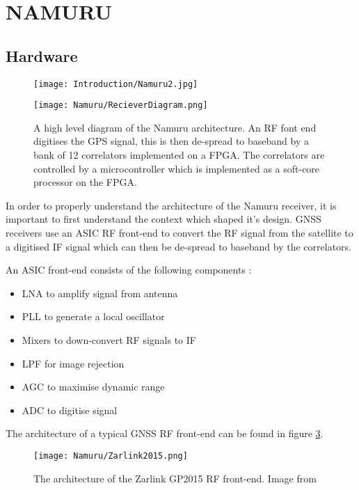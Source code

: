 \section{NAMURU}

\subsection{Hardware}

\begin{figure}[!htb] 
    \centering
    \texttt{[image: Introduction/Namuru2.jpg]} 
    \caption{}
    \label{fig:Namuru2}
\end{figure}

\begin{figure}[!htb] 
    \centering
    \texttt{[image: Namuru/RecieverDiagram.png]} 
    \caption{A high level diagram of the Namuru architecture. An RF font end digitises the GPS signal, this is then de-spread to baseband by a bank of 12 correlators implemented on a FPGA. The correlators are controlled by a microcontroller which is implemented as a soft-core processor on the FPGA.}
    \label{fig:RecieverDiagram}
\end{figure}

In order to properly understand the architecture of the Namuru receiver, it is important to first understand the context which shaped it's design. \ac{GNSS} receivers use an \ac{ASIC} RF front-end to convert the \ac{RF} signal from the satellite to a digitised \ac{IF} signal which can then be de-spread to baseband by the correlators. 

An \ac{ASIC} front-end consists of the following components \cite{GlennonPresentation}: 

\begin{itemize}
\item{\ac{LNA} to amplify signal from antenna}
\item{\ac{PLL} to generate a local oscillator}
\item{Mixers to down-convert RF signals to IF}
\item{\ac{LPF} for image rejection}
\item{\ac{AGC} to maximise dynamic range}
\item{\ac{ADC} to digitise signal}
\end{itemize}

The architecture of a typical \ac{GNSS} \ac{RF} front-end can be found in figure \ref{fig:Zarlink2015}.  

\begin{figure}[!htb] 
    \centering
    \texttt{[image: Namuru/Zarlink2015.png]} 
    \caption{The architecture of the Zarlink GP2015 \ac{RF} front-end. Image from \cite{Zarlink2015}}
    \label{fig:Zarlink2015}
\end{figure}

